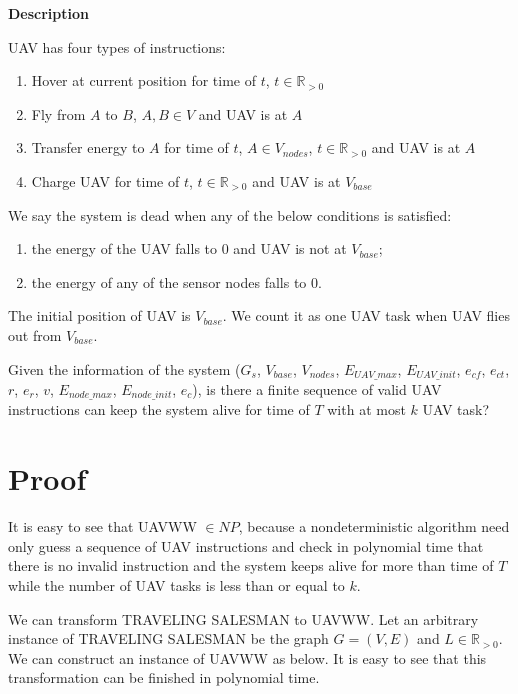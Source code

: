 \documentclass[11pt]{article}
\begin{document}
\noindent
\textbf{Description}

UAV has four types of instructions:
\begin{enumerate}[noitemsep]
\item Hover at current position for time of $t$, $t \in \mathbb{R}_{>0}$
\item Fly from $A$ to $B$, $A,B \in V$ and UAV is at $A$
\item Transfer energy to $A$ for time of $t$, $A \in V_{nodes}$, $t \in \mathbb{R}_{>0}$ and UAV is at $A$
\item Charge UAV for time of $t$, $t \in \mathbb{R}_{>0}$ and UAV is at $V_{base}$
\end{enumerate}

We say the system is dead when any of the below conditions is satisfied:
\begin{enumerate}[noitemsep]
\item the energy of the UAV falls to 0 and UAV is not at $V_{base}$;
\item the energy of any of the sensor nodes falls to 0.
\end{enumerate}

The initial position of UAV is $V_{base}$. We count it as one UAV task when UAV flies out from $V_{base}$.

Given the information of the system ($G_s$, $V_{base}$, $V_{nodes}$, $E_{UAV\_max} $, $E_{UAV\_init}$, $e_{cf}$, $e_{ct}$, $r$, $e_r$, $v$, $E_{node\_max}$, $E_{node\_init}$, $e_{c}$), is there a finite sequence of valid UAV instructions can keep the system alive for time of $T$ with at most $k$ UAV task?

\section{Proof}
It is easy to see that UAVWW $\in NP$, because a nondeterministic algorithm need only guess a sequence of UAV instructions and check in polynomial time that there is no invalid instruction and the system keeps alive for more than time of $T$ while the number of UAV tasks is less than or equal to $k$.

We can transform TRAVELING SALESMAN to UAVWW. Let an arbitrary instance of TRAVELING SALESMAN be the graph $G = (V, E)$ and $L \in \mathbb{R}_{>0}$. We  can construct an instance of UAVWW as below. It is easy to see that this transformation can be finished in polynomial time.
\end{document}

